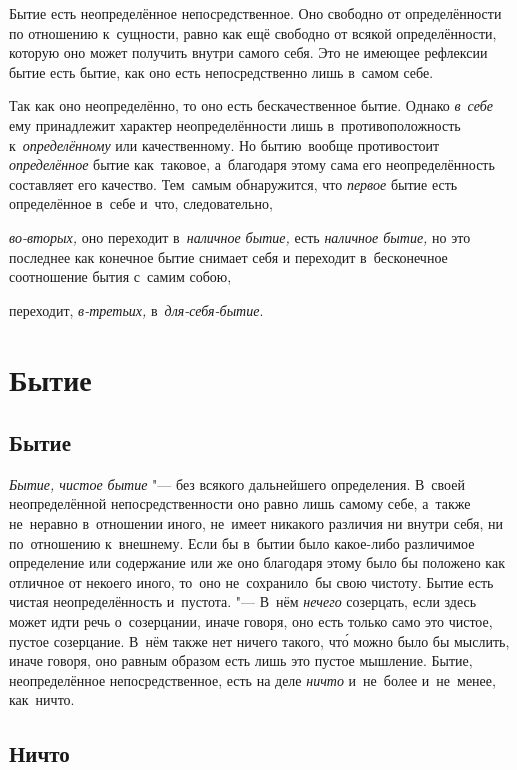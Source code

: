 Бытие есть неопределённое непосредственное. Оно свободно от определённости по
отношению к~сущности, равно как ещё свободно от всякой определённости, которую
оно может получить внутри самого себя. Это не имеющее рефлексии бытие есть
бытие, как оно есть непосредственно лишь в~самом себе.

Так как оно неопределённо, то оно есть бескачественное бытие. Однако
{\em в~себе} ему принадлежит характер неопределённости лишь в~противоположность
к~{\em определённому} или качественному. Но бытию~вообще противостоит
{\em определённое} бытие как~таковое, а~благодаря этому сама его
неопределённость составляет его качество. Тем~самым обнаружится, что
{\em первое} бытие есть определённое в~себе и~что, следовательно,

{\em во-вторых,} оно переходит в~{\em наличное бытие,} есть
{\em наличное бытие,} но это последнее как конечное бытие снимает себя
и переходит в~бесконечное соотношение бытия с~самим собою,

переходит, {\em в-третьих,} в~{\em для-себя-бытие}.

\section{Бытие}

\subsection{Бытие}


{\em Бытие, чистое бытие} "--- без всякого дальнейшего определения.
В~своей неопределённой непосредственности оно равно лишь самому себе, а~также
не~неравно в~отношении иного, не~имеет никакого различия ни внутри себя, ни
по~отношению к~внешнему. Если бы в~бытии было какое-либо различимое определение
или содержание или же оно благодаря этому было бы положено как отличное от
некоего иного, то~оно не~сохранило~бы свою чистоту. Бытие есть чистая
неопределённость и~пустота. "--- В~нём {\em нечего} созерцать, если здесь может
идти речь о~созерцании, иначе говоря, оно есть только само это чистое, пустое
созерцание. В~нём также нет ничего такого, чт\'{о} можно было бы мыслить, иначе
говоря, оно равным образом есть лишь это пустое мышление. Бытие, неопределённое
непосредственное, есть на деле {\em ничто} и~не~более и~не~менее, как~ничто.

\subsection{Ничто}

